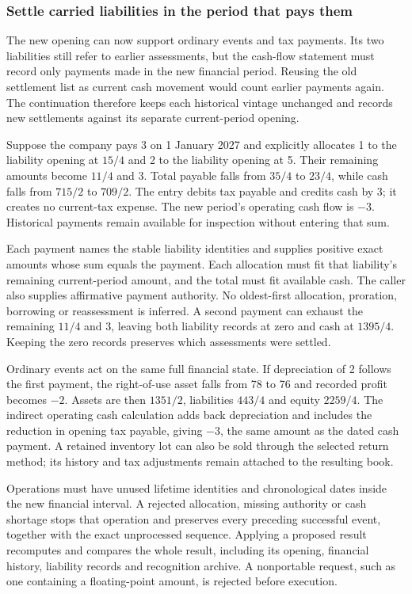 \subsubsection*{Settle carried liabilities in the period that pays them}
The new opening can now support ordinary events and tax payments. Its two
liabilities still refer to earlier assessments, but the cash-flow statement
must record only payments made in the new financial period. Reusing the old
settlement list as current cash movement would count earlier payments again.
The continuation therefore keeps each historical vintage unchanged and records
new settlements against its separate current-period opening.

Suppose the company pays 3 on 1 January 2027 and explicitly allocates 1 to the
liability opening at $15/4$ and 2 to the liability opening at 5. Their remaining
amounts become $11/4$ and 3. Total payable falls from $35/4$ to $23/4$, while
cash falls from $715/2$ to $709/2$. The entry debits tax payable and credits cash
by 3; it creates no current-tax expense. The new period's operating cash flow
is $-3$. Historical payments remain available for inspection without entering
that sum.

Each payment names the stable liability identities and supplies positive exact
amounts whose sum equals the payment. Each allocation must fit that liability's
remaining current-period amount, and the total must fit available cash. The
caller also supplies affirmative payment authority. No oldest-first allocation,
proration, borrowing or reassessment is inferred. A second payment can exhaust
the remaining $11/4$ and 3, leaving both liability records at zero and cash at
$1395/4$. Keeping the zero records preserves which assessments were settled.

Ordinary events act on the same full financial state. If depreciation of 2
follows the first payment, the right-of-use asset falls from 78 to 76 and
recorded profit becomes $-2$. Assets are then $1351/2$, liabilities $443/4$ and
equity $2259/4$. The indirect operating cash calculation adds back depreciation
and includes the reduction in opening tax payable, giving $-3$, the same amount
as the dated cash payment. A retained inventory lot can also be sold through
the selected return method; its history and tax adjustments remain attached to
the resulting book.

Operations must have unused lifetime identities and chronological dates inside
the new financial interval. A rejected allocation, missing authority or cash
shortage stops that operation and preserves every preceding successful event,
together with the exact unprocessed sequence. Applying a proposed result
recomputes and compares the whole result, including its opening, financial
history, liability records and recognition archive. A nonportable request,
such as one containing a floating-point amount, is rejected before execution.

